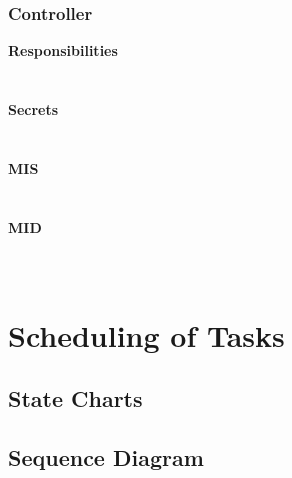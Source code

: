 \documentclass[titlepage]{article}
\begin{document}
\subsubsection{Controller}
\textbf{Responsibilities}\\
\\\\%
\textbf{Secrets}\\
\\\\%
\textbf{MIS}\\
\\\\%
\textbf{MID}\\
\\\\%


\section{Scheduling of Tasks}
\subsection{State Charts}
\subsection{Sequence Diagram}
\end{document}
